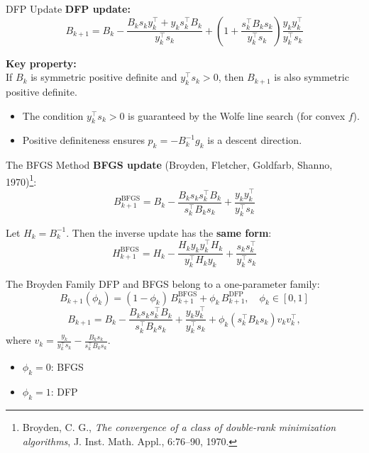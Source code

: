 \documentclass[aspectratio=169]{beamer}
\begin{document}
	\begin{frame}{DFP Update}
		\textbf{DFP update:}
		\[
		\boxed{B_{k+1}=B_k - \frac{B_k s_k y_k^\top + y_k s_k^\top B_k}{y_k^\top s_k}
			+ \left(1+\frac{s_k^\top B_k s_k}{y_k^\top s_k}\right)\frac{y_k y_k^\top}{y_k^\top s_k}}
		\]
		
		\vspace{0.2cm}
		\textbf{Key property:}\\
		If $B_k$ is symmetric positive definite and $y_k^\top s_k>0$, then $B_{k+1}$ is also symmetric positive definite.
		\vspace{0.2cm}
		\begin{itemize}
			\item The condition $y_k^\top s_k>0$ is guaranteed by the Wolfe line search (for convex $f$).
			\item Positive definiteness ensures $p_k=-B_k^{-1}g_k$ is a descent direction.
		\end{itemize}
	\end{frame}

	\begin{frame}{The BFGS Method}
		\textbf{BFGS update} (Broyden, Fletcher, Goldfarb, Shanno, 1970)\footnote{Broyden, C. G., \emph{The convergence of a class of double-rank minimization algorithms}, J. Inst. Math. Appl., 6:76–90, 1970.}:
		\[
		B_{k+1}^{\text{BFGS}} = B_k - \frac{B_k s_k s_k^\top B_k}{s_k^\top B_k s_k} + \frac{y_k y_k^\top}{y_k^\top s_k}
		\]
		
		Let \(H_k = B_k^{-1}\). Then the inverse update has the \textbf{same form}:
		\[
		H_{k+1}^{\text{BFGS}} = H_k - \frac{H_k y_k y_k^\top H_k}{y_k^\top H_k y_k} + \frac{s_k s_k^\top}{y_k^\top s_k}
		\]
	\end{frame}
	
	\begin{frame}{The Broyden Family}
		DFP and BFGS belong to a one-parameter family:
		\[
		B_{k+1}(\phi_k) = (1-\phi_k)\, B_{k+1}^{\text{BFGS}} + \phi_k\, B_{k+1}^{\text{DFP}}, \quad \phi_k \in [0,1]
		\]
		\[
		B_{k+1} = B_k - \frac{B_k s_k s_k^\top B_k}{s_k^\top B_k s_k} + \frac{y_k y_k^\top}{y_k^\top s_k} + \phi_k (s_k^\top B_k s_k) v_k v_k^\top,
		\]
		where $\displaystyle v_k = \frac{y_k}{y_k^\top s_k} - \frac{B_k s_k}{s_k^\top B_k s_k}$.
		
		\begin{itemize}
			\item $\phi_k = 0$: BFGS
			\item $\phi_k = 1$: DFP
		\end{itemize}
	\end{frame}
	
\end{document}
